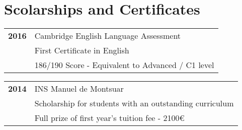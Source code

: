 \section{Scolarships and Certificates}

\begin{center}

\begin{tabular}{>{\bfseries \hfill} p{2cm} p{12cm}}
	2016		& Cambridge English Language Assessment 		\\
	~		& First Certificate in English	 			\\
	~		& 186/190 Score - Equivalent to Advanced / C1 level	\\
\end{tabular}
\vspace{5mm}
\begin{tabular}{>{\bfseries \hfill} p{2cm} p{12cm}}
	2014		& INS Manuel de Montsuar					\\
	~		& Scholarship for students with an outstanding curriculum 	\\
	~		& Full prize of first year's tuition fee - 2100\euro
\end{tabular}
\end{center}
